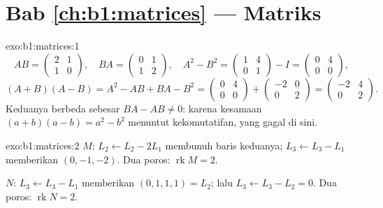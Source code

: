 \section*{Bab \ref{ch:b1:matrices} --- Matriks}

\begin{solution}{exo:b1:matrices:1}
\[
AB = \begin{pmatrix} 2 & 1\\ 1 & 0\end{pmatrix},
\quad
BA = \begin{pmatrix} 0 & 1\\ 1 & 2\end{pmatrix},
\quad
A^2 - B^2 = \begin{pmatrix} 1 & 4\\ 0 & 1\end{pmatrix} - I
= \begin{pmatrix} 0 & 4\\ 0 & 0\end{pmatrix},
\]
\[
(A+B)(A-B) = A^2 - AB + BA - B^2
= \begin{pmatrix} 0 & 4\\ 0 & 0\end{pmatrix} +
\begin{pmatrix} -2 & 0\\ 0 & 2 \end{pmatrix}
= \begin{pmatrix} -2 & 4\\ 0 & 2\end{pmatrix}.
\]
Keduanya berbeda sebesar $BA - AB \neq 0$: karena kesamaan $(a+b)(a-b) = a^2 -
b^2$ menuntut kekomutatifan, yang gagal di sini.
\end{solution}

\begin{solution}{exo:b1:matrices:2}
$M$: $L_2 \leftarrow L_2 - 2L_1$ membunuh baris keduanya; $L_3
\leftarrow L_3 - L_1$ memberikan $(0, -1, -2)$. Dua poros:
$\operatorname{rk} M = 2$.

$N$: $L_3 \leftarrow L_3 - L_1$ memberikan $(0,1,1,1) = L_2$; lalu $L_3
\leftarrow L_3 - L_2 = 0$. Dua poros: $\operatorname{rk} N = 2$.
\end{solution}


